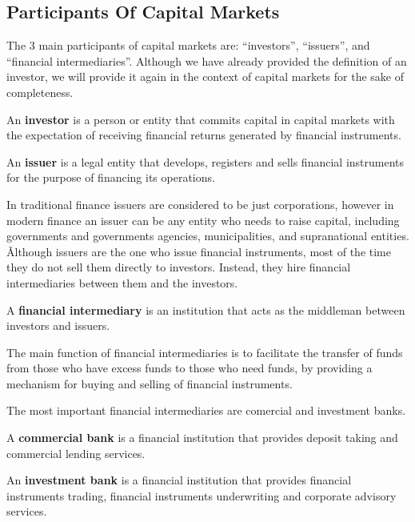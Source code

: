 \subsection{Participants Of Capital Markets}

The 3 main participants of capital markets are: ``investors'', ``issuers'', and ``financial intermediaries''. Although
we have already provided the definition of an investor, we will provide it again in the context of capital markets for
the sake of completeness.

\bd[Investor]
An \textbf{investor} is a person or entity that commits capital in capital markets with the expectation of receiving
financial returns generated by financial instruments.
\ed

\bd[Issuer]
An \textbf{issuer} is a legal entity that develops, registers and sells financial instruments for the purpose of
financing its operations.
\ed

In traditional finance issuers are considered to be just corporations, however in modern finance an issuer can be any
entity who needs to raise capital, including governments and governments agencies, municipalities, and supranational
entities. \v

Although issuers are the one who issue financial instruments, most of the time they do not sell them directly to
investors. Instead, they hire financial intermediaries between them and the investors.

A \textbf{financial intermediary} is an institution that acts as the middleman between investors and issuers.
\ed

The main function of financial intermediaries is to facilitate the transfer of funds from those who have excess funds
to those who need funds, by providing a mechanism for buying and selling of financial instruments.

\vspace{5pt}
\vspace{5pt}

The most important financial intermediaries are comercial and investment banks.

A \textbf{commercial bank} is a financial institution that provides deposit taking and commercial lending services.
\ed

An \textbf{investment bank} is a financial institution that provides financial instruments trading, financial
instruments underwriting and corporate advisory services.
\ed

